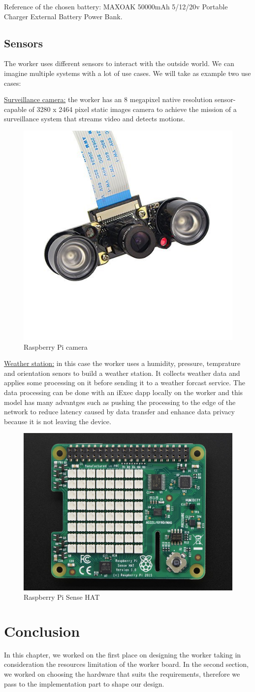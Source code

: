         Reference of the chosen battery: MAXOAK 50000mAh 5/12/20v Portable Charger External Battery Power Bank.

    \subsection{Sensors}
        The worker uses different sensors to interact with the outside world. We can imagine multiple systems
        with a lot of use cases. We will take as example two use cases:

        \underline{Surveillance camera:} the worker has an 8 megapixel native resolution sensor-capable of 3280 x 2464
        pixel static images camera to achieve the mission of a surveillance system that streams video and detects motions.

        \begin{figure}[!h]\centering
            \includegraphics[width=.2\columnwidth]{5-Design/figs/camera.jpg}
            \caption{Raspberry Pi camera}
        \end{figure}


        \underline{Weather station:} in this case the worker uses a humidity, pressure, temprature and
        orientation senors to build a weather station. It collects weather data and applies some
        processing on it before sending it to a weather forcast service. The data processing can be done
        with an iExec dapp locally on the worker and this model has many advantges such as pushing the
        processing to the edge of the network to reduce latency caused by data transfer and enhance data
        privacy because it is not leaving the device.

        \begin{figure}[!h]\centering
            \includegraphics[width=.3\columnwidth]{5-Design/figs/sense-hat.jpg}
            \caption{Raspberry Pi Sense HAT}
        \end{figure}

\section{Conclusion}
    In this chapter, we worked on the first place on designing the worker taking in consideration the resources
    limitation of the worker board. In the second section, we worked on choosing the hardware that suits
    the requirements, therefore we pass to the implementation part to shape our design.
